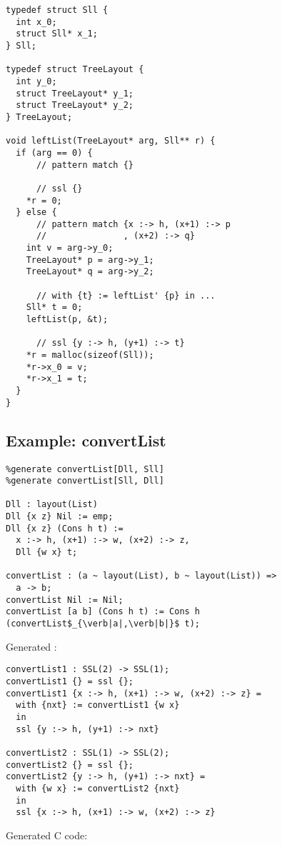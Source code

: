 \begin{lstlisting}
typedef struct Sll {
  int x_0;
  struct Sll* x_1;
} Sll;

typedef struct TreeLayout {
  int y_0;
  struct TreeLayout* y_1;
  struct TreeLayout* y_2;
} TreeLayout;

void leftList(TreeLayout* arg, Sll** r) {
  if (arg == 0) {
      // pattern match {}

      // ssl {}
    *r = 0;
  } else {
      // pattern match {x :-> h, (x+1) :-> p
      //               , (x+2) :-> q}
    int v = arg->y_0;
    TreeLayout* p = arg->y_1;
    TreeLayout* q = arg->y_2;

      // with {t} := leftList' {p} in ...
    Sll* t = 0;
    leftList(p, &t);

      // ssl {y :-> h, (y+1) :-> t}
    *r = malloc(sizeof(Sll));
    *r->x_0 = v;
    *r->x_1 = t;
  }
}
\end{lstlisting}


\subsection{Example: convertList}

\begin{lstlisting}
%generate convertList[Dll, Sll]
%generate convertList[Sll, Dll]

Dll : layout(List)
Dll {x z} Nil := emp;
Dll {x z} (Cons h t) :=
  x :-> h, (x+1) :-> w, (x+2) :-> z,
  Dll {w x} t;

convertList : (a ~ layout(List), b ~ layout(List)) =>
  a -> b;
convertList Nil := Nil;
convertList [a b] (Cons h t) := Cons h (convertList$_{\verb|a|,\verb|b|}$ t);
\end{lstlisting}

Generated \PikaCore:

\begin{lstlisting}
convertList1 : SSL(2) -> SSL(1);
convertList1 {} = ssl {};
convertList1 {x :-> h, (x+1) :-> w, (x+2) :-> z} =
  with {nxt} := convertList1 {w x}
  in
  ssl {y :-> h, (y+1) :-> nxt}

convertList2 : SSL(1) -> SSL(2);
convertList2 {} = ssl {};
convertList2 {y :-> h, (y+1) :-> nxt} =
  with {w x} := convertList2 {nxt}
  in
  ssl {x :-> h, (x+1) :-> w, (x+2) :-> z}
\end{lstlisting}

Generated C code:

